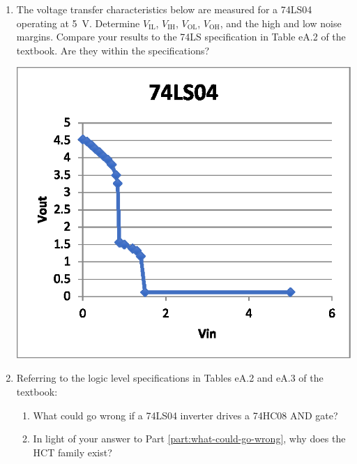 \documentclass{e85}
\date{2019 January}
\author{}
\begin{document}
\begin{enumerate}
\item The voltage transfer characteristics below are measured for a
  74LS04 operating at \SI{5}{\V}.  Determine \(V_\mathrm{IL}\),
  \(V_\mathrm{IH}\), \(V_\mathrm{OL}\), \(V_\mathrm{OH}\), and the
  high and low noise margins.  Compare your results to the 74LS
  specification in Table eA.2 of the textbook.  Are they within the
  specifications?
  \begin{center}
    \includegraphics{figures/01.eps}
  \end{center}

  \begin{solution}

  \end{solution}

\item Referring to the logic level specifications in Tables eA.2 and
  eA.3 of the textbook:
  \begin{enumerate}
  \item \label{part:what-could-go-wrong} What could go wrong if a
    74LS04 inverter drives a 74HC08 AND gate?

    \begin{solution}

    \end{solution}

  \item In light of your answer to Part
    \ref{part:what-could-go-wrong}, why does the HCT family exist?


\end{enumerate}
\end{enumerate}
\end{document}
